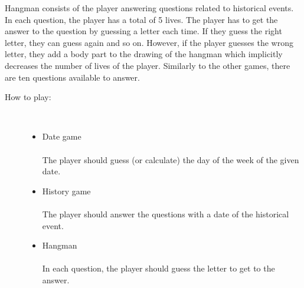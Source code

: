 \documentclass[9pt]{article}
\begin{document}
    Hangman consists of the player answering questions related to historical events. In each question, the player has a total of 5 lives. The player has to get the answer to the question by guessing a letter each time. If they guess the right letter, they can guess again and so on. However, if the player guesses the wrong letter, they add a body part to the drawing of the hangman which implicitly decreases the number of lives of the player. Similarly to the other games, there are ten questions available to answer.\\
    
    \begin{description}
    \item[How to play:] \hfill \\
        \begin{itemize}
            \item Date game \\\\
            The player should guess (or calculate) the day of the week of the given date.\\
            \item History game \\\\
            The player should answer the questions with a date of the historical event.\\
            \item Hangman \\\\
            In each question, the player should guess the letter to get to the answer.\\
        \end{itemize}
   

\end{description}
\end{document}
